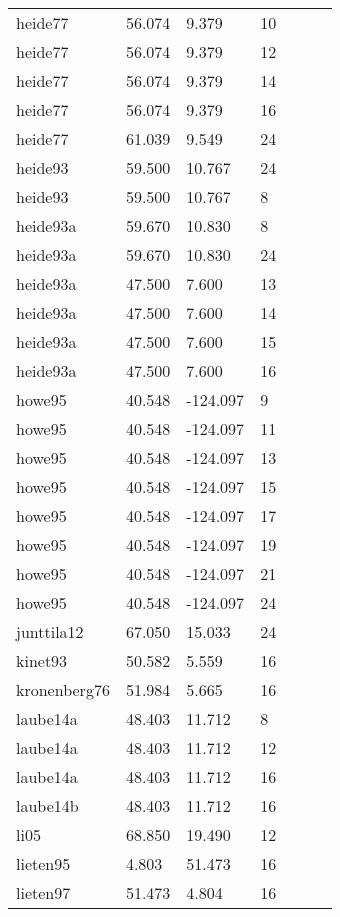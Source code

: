 \documentclass{article}
\begin{document}
\begin{table}[ht]
\begin{tabular}{|p{}|p{}|p{}|p{}|p{}|p{}|p{}|}
  heide77 & 56.074 & 9.379 & 10 &  &  &  \\ 
  heide77 & 56.074 & 9.379 & 12 &  &  &  \\ 
  heide77 & 56.074 & 9.379 & 14 &  &  &  \\ 
  heide77 & 56.074 & 9.379 & 16 &  &  &  \\ 
  heide77 & 61.039 & 9.549 & 24 &  &  &  \\ 
  heide93 & 59.500 & 10.767 & 24 &  &  &  \\ 
  heide93 & 59.500 & 10.767 & 8 &  &  &  \\ 
  heide93a & 59.670 & 10.830 & 8 &  &  &  \\ 
  heide93a & 59.670 & 10.830 & 24 &  &  &  \\ 
  heide93a & 47.500 & 7.600 & 13 &  &  &  \\ 
  heide93a & 47.500 & 7.600 & 14 &  &  &  \\ 
  heide93a & 47.500 & 7.600 & 15 &  &  &  \\ 
  heide93a & 47.500 & 7.600 & 16 &  &  &  \\ 
  howe95 & 40.548 & -124.097 & 9 &  &  &  \\ 
  howe95 & 40.548 & -124.097 & 11 &  &  &  \\ 
  howe95 & 40.548 & -124.097 & 13 &  &  &  \\ 
  howe95 & 40.548 & -124.097 & 15 &  &  &  \\ 
  howe95 & 40.548 & -124.097 & 17 &  &  &  \\ 
  howe95 & 40.548 & -124.097 & 19 &  &  &  \\ 
  howe95 & 40.548 & -124.097 & 21 &  &  &  \\ 
  howe95 & 40.548 & -124.097 & 24 &  &  &  \\ 
  junttila12 & 67.050 & 15.033 & 24 &  &  &  \\ 
  kinet93 & 50.582 & 5.559 & 16 &  &  &  \\ 
  kronenberg76 & 51.984 & 5.665 & 16 &  &  &  \\ 
  laube14a & 48.403 & 11.712 & 8 &  &  &  \\ 
  laube14a & 48.403 & 11.712 & 12 &  &  &  \\ 
  laube14a & 48.403 & 11.712 & 16 &  &  &  \\ 
  laube14b & 48.403 & 11.712 & 16 &  &  &  \\ 
  li05 & 68.850 & 19.490 & 12 &  &  &  \\ 
  lieten95 & 4.803 & 51.473 & 16 &  &  &  \\ 
  lieten97 & 51.473 & 4.804 & 16 &  &  &  \\ 

\end{tabular}
\end{table}
\end{document}

